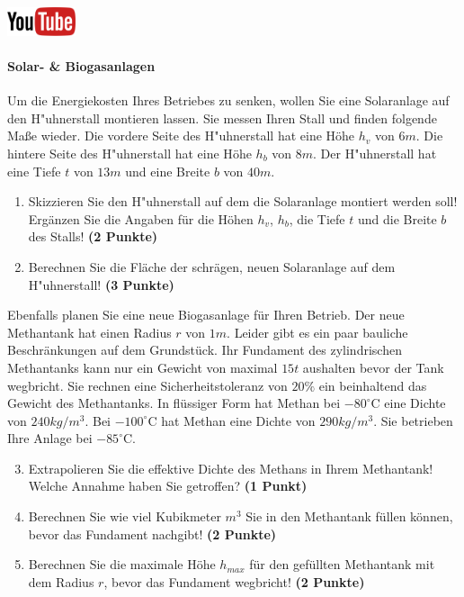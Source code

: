 \documentclass[a4paper, 10pt]{scrartcl}\usepackage[]{graphicx}\usepackage[]{xcolor}
\begin{document}
\hfill\href{https://youtu.be/aBxLkdF-c4M}{\includegraphics[width =
  2cm]{img/youtube}} %
\hspace{2Ex}

\paragraph{Solar- \& Biogasanlagen}



Um die Energiekosten Ihres Betriebes zu senken, wollen Sie eine Solaranlage
auf den H{"u}hnerstall montieren lassen. Sie messen Ihren Stall und finden
folgende Ma{\ss}e wieder. Die vordere Seite des H{"u}hnerstall hat eine H{\"o}he
$h_v$ von $6m$. Die hintere Seite des H{"u}hnerstall hat eine
H{\"o}he $h_b$ von $8m$. Der H{"u}hnerstall hat eine Tiefe $t$ von
$13m$ und eine Breite $b$ von $40m$.

\begin{enumerate}
\item Skizzieren Sie den H{"u}hnerstall auf dem die Solaranlage montiert
  werden soll! Erg{\"a}nzen Sie die Angaben f{\"u}r die H{\"o}hen $h_v$, $h_b$, die
  Tiefe $t$ und die Breite $b$ des Stalls!  \textbf{(2 Punkte)}
\item Berechnen Sie die Fl{\"a}che der schr{\"a}gen, neuen Solaranlage auf dem
  H{"u}hnerstall! \textbf{(3 Punkte)}
\end{enumerate}

Ebenfalls planen Sie eine neue Biogasanlage f{\"u}r Ihren Betrieb. Der neue
Methantank hat einen Radius $r$ von $1m$. Leider gibt es ein
paar bauliche Beschr{\"a}nkungen auf dem Grundst{\"u}ck. Ihr Fundament des
zylindrischen Methantanks kann nur ein Gewicht von maximal
$15t$ aushalten bevor der Tank wegbricht. Sie rechnen eine
Sicherheitstoleranz von $20\%$ ein beinhaltend das Gewicht des
Methantanks. In fl{\"u}ssiger Form hat
Methan bei $-80^\circ\text{C}$ eine Dichte von
$240kg/m^3$. Bei $-100^\circ\text{C}$ hat Methan eine Dichte
von $290kg/m^3$. Sie betrieben Ihre Anlage bei
$-85^\circ\text{C}$.

\begin{enumerate}
  \setcounter{enumi}{2}
\item Extrapolieren Sie die effektive Dichte des Methans in Ihrem
  Methantank! Welche Annahme haben Sie getroffen? \textbf{(1 Punkt)}
\item Berechnen Sie wie viel Kubikmeter $m^3$ Sie in den Methantank f{\"u}llen
  k{\"o}nnen, bevor das Fundament nachgibt! \textbf{(2 Punkte)}
\item Berechnen Sie die maximale H{\"o}he $h_{max}$ f{\"u}r den gef{\"u}llten
  Methantank mit dem Radius $r$, bevor das Fundament wegbricht! \textbf{(2
    Punkte)}
\end{enumerate}
\end{document}
